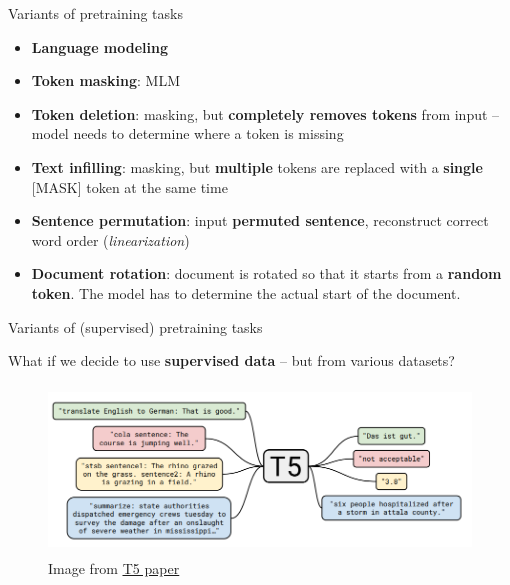 \documentclass[12pt,aspectratio=169,handout]{beamer}
\begin{document}
\begin{frame}{Variants of pretraining tasks}

	\begin{itemize}
		\item \textbf{Language modeling}
		\pause
		\item \textbf{Token masking}: MLM
		\pause
		\item \textbf{Token deletion}: masking, but \textbf{completely removes tokens} from input -- model needs to determine where a token is missing
		\pause 
		\item \textbf{Text infilling}: masking, but \textbf{multiple} tokens are replaced with a \textbf{single} [MASK] token at the same time
		\pause
		\item \textbf{Sentence permutation}: input \textbf{permuted sentence}, reconstruct correct word order (\textit{linearization})
		\pause
		\item \textbf{Document rotation}: document is rotated so that it starts from a \textbf{random token}. The model has to determine the actual start of the document.
	\end{itemize}
	
\end{frame}

\begin{frame}{Variants of (supervised) pretraining tasks}

What if we decide to use \textbf{supervised data} -- but from various datasets?

\pause

\begin{figure}[h]
	\includegraphics[height=4.5cm]{t5-objectives}
	\caption*{Image from \href{https://jmlr.org/papers/volume21/20-074/20-074.pdf}{\underline{T5 paper}}}
\end{figure}

\end{frame}
\end{document}
